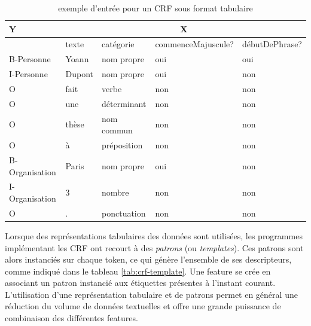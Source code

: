 \documentclass[12pt,a4paper,times,twoside,openright]{report}
\begin{document}
\begin{table}[ht!]
\begin{tabular}{|l|l|l|l|l|}
\hline
Y              & \multicolumn{4}{c|}{X} \\
\hline
               & texte & catégorie & commenceMajuscule? & débutDePhrase? \\
\cline{2-5}
B-Personne     & Yoann & nom propre & oui & oui \\
I-Personne     & Dupont & nom propre & oui & non \\
O              & fait & verbe & non & non \\
O              & une & déterminant & non & non \\
O              & thèse & nom commun & non & non \\
O              & à & préposition & non & non \\
B-Organisation & Paris & nom propre & oui & non \\
I-Organisation & 3 & nombre & non & non \\
O              & . & ponctuation & non & non \\
\hline
\end{tabular}
\caption{exemple d'entrée pour un CRF sous format tabulaire}
\label{tab:CRF-input-tabular}
\end{table}

Lorsque des représentations tabulaires des données sont utilisées, les programmes implémentant les CRF ont recourt à des \emph{patrons} (ou \emph{templates}). Ces patrons sont alors instanciés sur chaque token, ce qui génère l'ensemble de ses descripteurs, comme indiqué dans le tableau \ref{tab:crf-template}. Une feature se crée en associant un patron instancié aux étiquettes présentes à l'instant courant. L'utilisation d'une représentation tabulaire et de patrons permet en général une réduction du volume de données textuelles et offre une grande puissance de combinaison des différentes features.
\end{document}
